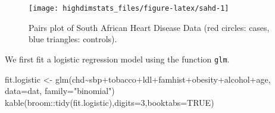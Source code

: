 \documentclass[
]{book}
\newenvironment{Shaded}{\begin{snugshade}}{\end{snugshade}}
\newcommand{\AttributeTok}[1]{\textcolor[rgb]{0.77,0.63,0.00}{#1}}
\newcommand{\ConstantTok}[1]{\textcolor[rgb]{0.00,0.00,0.00}{#1}}
\newcommand{\DecValTok}[1]{\textcolor[rgb]{0.00,0.00,0.81}{#1}}
\newcommand{\FunctionTok}[1]{\textcolor[rgb]{0.00,0.00,0.00}{#1}}
\newcommand{\NormalTok}[1]{#1}
\newcommand{\OtherTok}[1]{\textcolor[rgb]{0.56,0.35,0.01}{#1}}
\newcommand{\SpecialCharTok}[1]{\textcolor[rgb]{0.00,0.00,0.00}{#1}}
\newcommand{\StringTok}[1]{\textcolor[rgb]{0.31,0.60,0.02}{#1}}
\begin{document}
\begin{Shaded}
\end{Shaded}

\begin{figure}

{\centering \texttt{[image: highdimstats\_files/figure-latex/sahd-1]} 

}

\caption{Pairs plot of South African Heart Disease Data (red circles: cases, blue triangles: controls).}\label{fig:sahd}
\end{figure}

We first fit a logistic regression model using the function \texttt{glm}.

\begin{Shaded}
\begin{Highlighting}[]
\NormalTok{fit.logistic }\OtherTok{\textless{}{-}} \FunctionTok{glm}\NormalTok{(chd}\SpecialCharTok{\textasciitilde{}}\NormalTok{sbp}\SpecialCharTok{+}\NormalTok{tobacco}\SpecialCharTok{+}\NormalTok{ldl}\SpecialCharTok{+}\NormalTok{famhist}\SpecialCharTok{+}\NormalTok{obesity}\SpecialCharTok{+}\NormalTok{alcohol}\SpecialCharTok{+}\NormalTok{age,}
                    \AttributeTok{data=}\NormalTok{dat,}
                    \AttributeTok{family=}\StringTok{"binomial"}\NormalTok{)}
\FunctionTok{kable}\NormalTok{(broom}\SpecialCharTok{::}\FunctionTok{tidy}\NormalTok{(fit.logistic),}\AttributeTok{digits=}\DecValTok{3}\NormalTok{,}\AttributeTok{booktabs=}\ConstantTok{TRUE}\NormalTok{)}
\end{Highlighting}
\end{Shaded}
\end{document}
